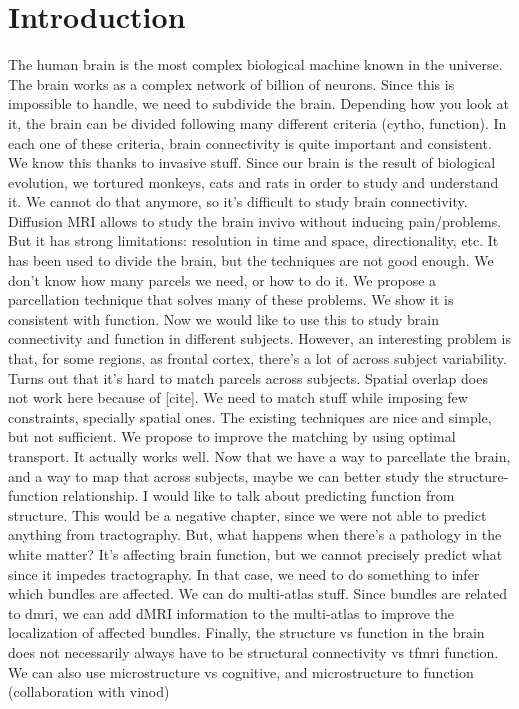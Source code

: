 \chapter{Introduction}

The human brain is the most complex biological machine known in the universe.
The brain works as a complex network of billion of neurons.
Since this is impossible to handle, we need to subdivide the brain.
Depending how you look at it, the brain can be divided following many different criteria (cytho, function).
In each one of these criteria, brain connectivity is quite important and consistent.
We know this thanks to invasive stuff.
Since our brain is the result of biological evolution, we tortured monkeys, cats and rats in order to study and understand it.
We cannot do that anymore, so it's difficult to study brain connectivity.
Diffusion MRI allows to study the brain invivo without inducing pain/problems.
But it has strong limitations: resolution in time and space, directionality, etc.
It has been used to divide the brain, but the techniques are not good enough.
We don't know how many parcels we need, or how to do it.
We propose a parcellation technique that solves many of these problems.
We show it is consistent with function.
Now we would like to use this to study brain connectivity and function in different subjects.
However, an interesting problem is that, for some regions, as frontal cortex, there's a lot of across subject variability.
Turns out that it's hard to match parcels across subjects.
Spatial overlap does not work here because of [cite].
We need to match stuff while imposing few constraints, specially spatial ones.
The existing techniques are nice and simple, but not sufficient.
We propose to improve the matching by using optimal transport.
It actually works well.
Now that we have a way to parcellate the brain, and a way to map that across subjects, maybe we can better study the structure-function relationship.
I would like to talk about predicting function from structure.
This would be a negative chapter, since we were not able to predict anything from tractography.
But, what happens when there's a pathology in the white matter?
It's affecting brain function, but we cannot precisely predict what since it impedes tractography.
In that case, we need to do something to infer which bundles are affected.
We can do multi-atlas stuff.
Since bundles are related to dmri, we can add dMRI information to the multi-atlas to improve the localization of affected bundles.
Finally, the structure vs function in the brain does not necessarily always have to be structural connectivity vs tfmri function.
We can also use microstructure vs cognitive, and microstructure to function (collaboration with vinod)

